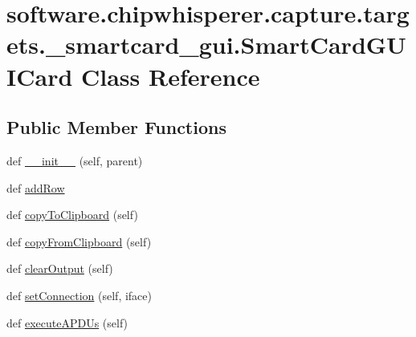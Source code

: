 \hypertarget{classsoftware_1_1chipwhisperer_1_1capture_1_1targets_1_1__smartcard__gui_1_1SmartCardGUICard}{}\section{software.\+chipwhisperer.\+capture.\+targets.\+\_\+smartcard\+\_\+gui.\+Smart\+Card\+G\+U\+I\+Card Class Reference}
\label{classsoftware_1_1chipwhisperer_1_1capture_1_1targets_1_1__smartcard__gui_1_1SmartCardGUICard}
\subsection*{Public Member Functions}
\begin{DoxyCompactItemize}
\item 
def \hyperlink{classsoftware_1_1chipwhisperer_1_1capture_1_1targets_1_1__smartcard__gui_1_1SmartCardGUICard_a98799041e66ed39c5a7818a1e3232c0d}{\+\_\+\+\_\+init\+\_\+\+\_\+} (self, parent)
\item 
def \hyperlink{classsoftware_1_1chipwhisperer_1_1capture_1_1targets_1_1__smartcard__gui_1_1SmartCardGUICard_a77d926d83cf24050c5e5e6efa7bb53f4}{add\+Row}
\item 
def \hyperlink{classsoftware_1_1chipwhisperer_1_1capture_1_1targets_1_1__smartcard__gui_1_1SmartCardGUICard_ae9a4a165796832cab0aa2c4593fc1bbe}{copy\+To\+Clipboard} (self)
\item 
def \hyperlink{classsoftware_1_1chipwhisperer_1_1capture_1_1targets_1_1__smartcard__gui_1_1SmartCardGUICard_a8eedbb4976c4d96644d3c2652f0dcdc2}{copy\+From\+Clipboard} (self)
\item 
def \hyperlink{classsoftware_1_1chipwhisperer_1_1capture_1_1targets_1_1__smartcard__gui_1_1SmartCardGUICard_adc63781ddae571923e1a4d6f6b4e5c90}{clear\+Output} (self)
\item 
def \hyperlink{classsoftware_1_1chipwhisperer_1_1capture_1_1targets_1_1__smartcard__gui_1_1SmartCardGUICard_a2fe1391c47c39625bd9c7c52db79dd41}{set\+Connection} (self, iface)
\item 
def \hyperlink{classsoftware_1_1chipwhisperer_1_1capture_1_1targets_1_1__smartcard__gui_1_1SmartCardGUICard_ad4b26ee7b790d5a4fc35f4e67b770480}{execute\+A\+P\+D\+Us} (self)
\end{DoxyCompactItemize}
